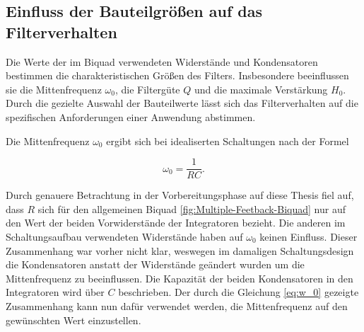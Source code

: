 \documentclass[../main_config.tex]{subfiles}
\begin{document}








\subsection{Einfluss der Bauteilgrößen auf das Filterverhalten}
\label{sec:theorie_kA}

Die Werte der im Biquad verwendeten Widerstände und Kondensatoren bestimmen die charakteristischen Größen des Filters. Insbesondere beeinflussen sie die Mittenfrequenz $\omega_0$, die Filtergüte $Q$ und die maximale Verstärkung $H_0$. Durch die gezielte Auswahl der Bauteilwerte lässt sich das Filterverhalten auf die spezifischen Anforderungen einer Anwendung abstimmen.\par
\medskip
Die Mittenfrequenz $\omega_0$ ergibt sich bei idealiserten Schaltungen nach der Formel

\begin{equation}
    \omega_0 = \frac{1}{RC}. 
    \label{eq:w_0}
\end{equation}

Durch genauere Betrachtung in der Vorbereitungsphase auf diese Thesis fiel auf, dass $R$ sich für den allgemeinen Biquad \ref{fig:Multiple-Feetback-Biquad} nur auf den Wert der beiden Vorwiderstände der Integratoren bezieht. Die anderen im Schaltungsaufbau verwendeten Widerstände haben auf $\omega_0$ keinen Einfluss. Dieser Zusammenhang war vorher nicht klar, weswegen im damaligen Schaltungsdesign die Kondensatoren anstatt der Widerstände geändert wurden um die Mittenfrequenz zu beeinflussen. Die Kapazität der beiden Kondensatoren in den Integratoren wird über $C$ beschrieben. Der durch die Gleichung \ref{eq:w_0} gezeigte Zusammenhang kann nun dafür verwendet werden, die Mittenfrequenz auf den gewünschten Wert einzustellen.\par
\medskip

 

\end{document}
